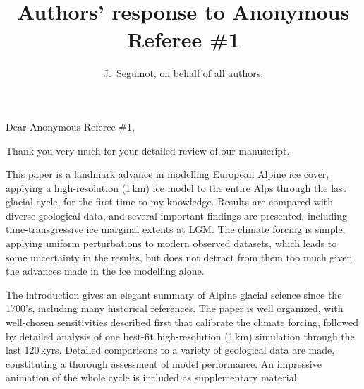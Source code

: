 

\title{Authors' response to Anonymous Referee \#1}
\author{J.~Seguinot, on behalf of all authors.}


\maketitle
\bigskip


\newcommand{\sechead}[1]{\bigskip\noindent\textbf{#1}}
\newcommand{\referee}[1]{\bigskip\noindent\textcolor{journalname}{#1}}
\newcommand{\msquote}[1]{\begin{quote}\textit{#1}\end{quote}}
\newcommand{\doi}[1]{doi:\allowbreak\href{http://dx.doi.org/#1}{#1}}

    Dear Anonymous Referee \#1,

    Thank you very much for your detailed review of our manuscript.

    \referee{%
        This paper is a landmark advance in modelling European Alpine ice
        cover, applying a high-resolution (1\,km) ice model to the entire Alps
        through the last glacial cycle, for the first time to my knowledge.
        Results are compared with diverse geological data, and several
        important findings are presented, including time-transgressive ice
        marginal extents at LGM. The climate forcing is simple, applying
        uniform perturbations to modern observed datasets, which leads to some
        uncertainty in the results, but does not detract from them too much
        given the advances made in the ice modelling alone.}

    \referee{%
        The introduction gives an elegant summary of Alpine glacial science
        since the 1700's, including many historical references. The paper is
        well organized, with well-chosen sensitivities described first that
        calibrate the climate forcing, followed by detailed analysis of one
        best-fit high-resolution (1\,km) simulation through the last 120\,kyrs.
        Detailed comparisons to a variety of geological data are made,
        constituting a thorough assessment of model performance. An impressive
        animation of the whole cycle is included as supplementary material.}

